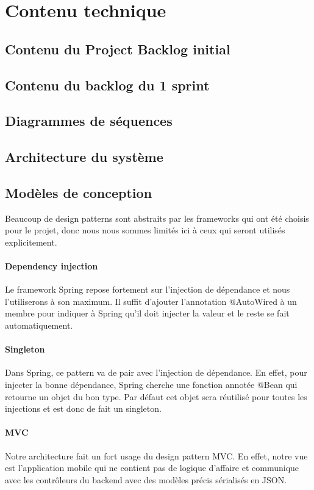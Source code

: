 \section{Contenu technique}
	\subsection{Contenu du \og Project Backlog \fg initial}
	\subsection{Contenu du backlog du 1\ier{} sprint}
	\subsection{Diagrammes de séquences}
	\subsection{Architecture du système}

	\subsection{Modèles de conception}
	Beaucoup de design patterns sont abstraits par les frameworks qui ont été choisis pour le projet, donc nous nous sommes limités ici à ceux qui seront utilisés explicitement.
	\paragraph{Dependency injection} Le framework Spring repose fortement sur l’injection de dépendance et nous l’utiliserons à son maximum. Il suffit d’ajouter l’annotation @AutoWired à un membre pour indiquer à Spring qu’il doit injecter la valeur et le reste se fait automatiquement.
	\paragraph{Singleton} Dans Spring, ce pattern va de pair avec l’injection de dépendance. En effet, pour injecter la bonne dépendance, Spring cherche une fonction annotée @Bean qui retourne un objet du bon type. Par défaut cet objet sera réutilisé pour toutes les injections et est donc de fait un singleton. 
	\paragraph{MVC} Notre architecture fait un fort usage du design pattern MVC. En effet, notre vue est l’application mobile qui ne contient pas de logique d’affaire et communique avec les contrôleurs du backend avec des modèles précis sérialisés en JSON. 
